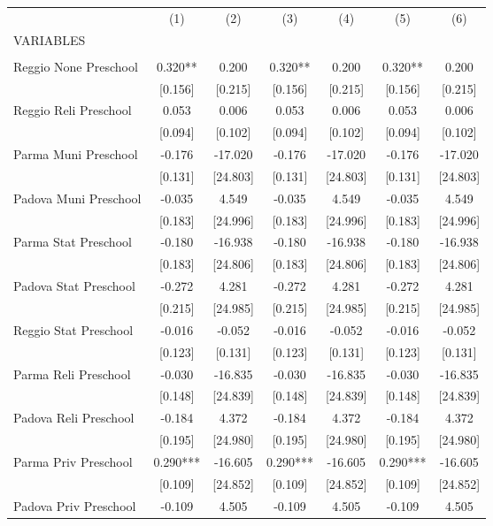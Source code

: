 \begin{tabular}{lcccccc} \hline
 & (1) & (2) & (3) & (4) & (5) & (6) \\
VARIABLES &  &  &  &  &  &  \\ \hline
 &  &  &  &  &  &  \\
Reggio None Preschool & 0.320** & 0.200 & 0.320** & 0.200 & 0.320** & 0.200 \\
 & [0.156] & [0.215] & [0.156] & [0.215] & [0.156] & [0.215] \\
Reggio Reli Preschool & 0.053 & 0.006 & 0.053 & 0.006 & 0.053 & 0.006 \\
 & [0.094] & [0.102] & [0.094] & [0.102] & [0.094] & [0.102] \\
Parma Muni Preschool & -0.176 & -17.020 & -0.176 & -17.020 & -0.176 & -17.020 \\
 & [0.131] & [24.803] & [0.131] & [24.803] & [0.131] & [24.803] \\
Padova Muni Preschool & -0.035 & 4.549 & -0.035 & 4.549 & -0.035 & 4.549 \\
 & [0.183] & [24.996] & [0.183] & [24.996] & [0.183] & [24.996] \\
Parma Stat Preschool & -0.180 & -16.938 & -0.180 & -16.938 & -0.180 & -16.938 \\
 & [0.183] & [24.806] & [0.183] & [24.806] & [0.183] & [24.806] \\
Padova Stat Preschool & -0.272 & 4.281 & -0.272 & 4.281 & -0.272 & 4.281 \\
 & [0.215] & [24.985] & [0.215] & [24.985] & [0.215] & [24.985] \\
Reggio Stat Preschool & -0.016 & -0.052 & -0.016 & -0.052 & -0.016 & -0.052 \\
 & [0.123] & [0.131] & [0.123] & [0.131] & [0.123] & [0.131] \\
Parma Reli Preschool & -0.030 & -16.835 & -0.030 & -16.835 & -0.030 & -16.835 \\
 & [0.148] & [24.839] & [0.148] & [24.839] & [0.148] & [24.839] \\
Padova Reli Preschool & -0.184 & 4.372 & -0.184 & 4.372 & -0.184 & 4.372 \\
 & [0.195] & [24.980] & [0.195] & [24.980] & [0.195] & [24.980] \\
Parma Priv Preschool & 0.290*** & -16.605 & 0.290*** & -16.605 & 0.290*** & -16.605 \\
 & [0.109] & [24.852] & [0.109] & [24.852] & [0.109] & [24.852] \\
Padova Priv Preschool & -0.109 & 4.505 & -0.109 & 4.505 & -0.109 & 4.505 \\

\end{tabular}
